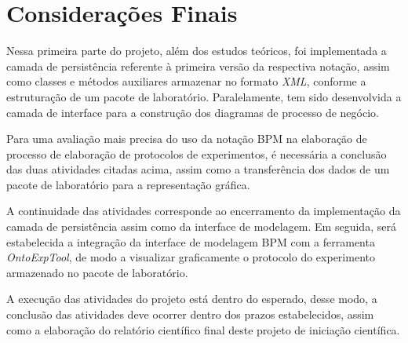 \chapter{Considerações Finais}
\label{cp:conclusoes}

Nessa primeira parte do projeto, além dos estudos teóricos, foi implementada a camada de persistência referente à primeira versão da respectiva notação, assim como classes e métodos auxiliares armazenar no formato \textit{XML}, conforme a estruturação de um pacote de laboratório. Paralelamente, tem sido desenvolvida a camada de interface para a construção dos diagramas de processo de negócio.

Para uma avaliação mais precisa do uso da notação BPM na elaboração de processo de elaboração de protocolos de experimentos, é necessária a conclusão das duas atividades citadas acima, assim como a transferência dos dados de um pacote de laboratório para a representação gráfica.

A continuidade das atividades corresponde ao encerramento da implementação da camada de persistência assim como da interface de modelagem. Em seguida, será estabelecida a integração da interface de modelagem BPM com a ferramenta \textit{OntoExpTool}, de modo a visualizar graficamente o protocolo do experimento armazenado no pacote de laboratório.

A execução das atividades do projeto está dentro do esperado, desse modo, a conclusão das atividades deve ocorrer dentro dos prazos estabelecidos, assim como a elaboração do relatório científico final deste projeto de iniciação científica.